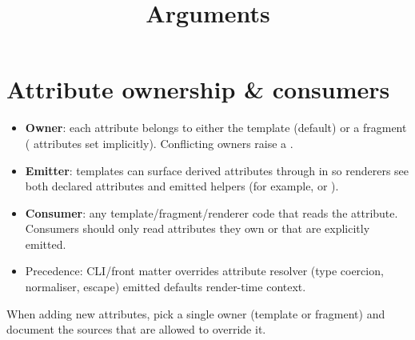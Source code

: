 \documentclass[a4paper,twoside]{article}
\title{Arguments}
\author{}\date{}
\begin{document}
\maketitle
\section{Attribute ownership \& consumers}
\begin{itemize}
\item \textbf{Owner}: each attribute belongs to either the template (default) or a fragment ( attributes set  implicitly). Conflicting owners raise a .
\item \textbf{Emitter}: templates can surface derived attributes through  in  so renderers see both declared attributes and emitted helpers (for example,  or ).
\item \textbf{Consumer}: any template/fragment/renderer code that reads the attribute. Consumers should only read attributes they own or that are explicitly emitted.
\item Precedence: CLI/front matter overrides attribute resolver (type coercion, normaliser, escape) emitted defaults render-time context.
\end{itemize}
When adding new attributes, pick a single owner (template or fragment) and document the sources that are allowed to override it.
\end{document}
